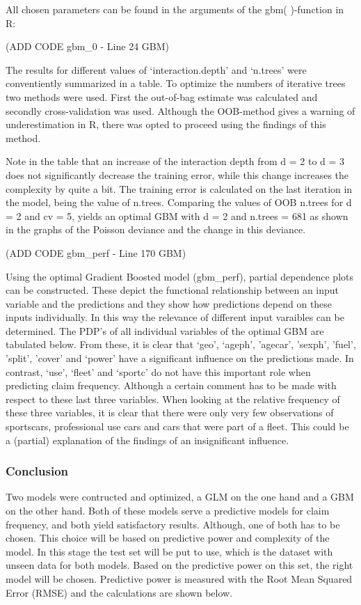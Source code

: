 \documentclass[
  12pt,
]{article}
\begin{document}
All chosen parameters can be found in the arguments of the gbm(
)-function in R:

(ADD CODE gbm\_0 - Line 24 GBM)

The results for different values of `interaction.depth' and `n.trees'
were conventiently summarized in a table. To optimize the numbers of
iterative trees two methods were used. First the out-of-bag estimate was
calculated and secondly cross-validation was used. Although the
OOB-method gives a warning of underestimation in R, there was opted to
proceed using the findings of this method.

Note in the table that an increase of the interaction depth from d = 2
to d = 3 does not significantly decrease the training error, while this
change increases the complexity by quite a bit. The training error is
calculated on the last iteration in the model, being the value of
n.trees. Comparing the values of OOB n.trees for d = 2 and cv = 5,
yields an optimal GBM with d = 2 and n.trees = 681 as shown in the
graphs of the Poisson deviance and the change in this deviance.

(ADD CODE gbm\_perf - Line 170 GBM)

Using the optimal Gradient Boosted model (gbm\_perf), partial dependence
plots can be constructed. These depict the functional relationship
between an input variable and the predictions and they show how
predictions depend on these inputs individually. In this way the
relevance of different input varaibles can be determined. The PDP's of
all individual variables of the optimal GBM are tabulated below. From
these, it is clear that `geo', `ageph', 'agecar', 'sexph', 'fuel',
'split', 'cover' and `power' have a significant influence on the
predictions made. In contrast, `use', `fleet' and `sportc' do not have
this important role when predicting claim frequency. Although a certain
comment has to be made with respect to these last three variables. When
looking at the relative frequency of these three variables, it is clear
that there were only very few observations of sportscars, professional
use cars and cars that were part of a fleet. This could be a (partial)
explanation of the findings of an insignificant influence.

\hypertarget{conclusion}{%
\subsubsection{Conclusion}\label{conclusion}}

Two models were contructed and optimized, a GLM on the one hand and a
GBM on the other hand. Both of these models serve a predictive models
for claim frequency, and both yield satisfactory results. Although, one
of both has to be chosen. This choice will be based on predictive power
and complexity of the model. In this stage the test set will be put to
use, which is the dataset with unseen data for both models. Based on the
predictive power on this set, the right model will be chosen. Predictive
power is measured with the Root Mean Squared Error (RMSE) and the
calculations are shown below.
\end{document}
